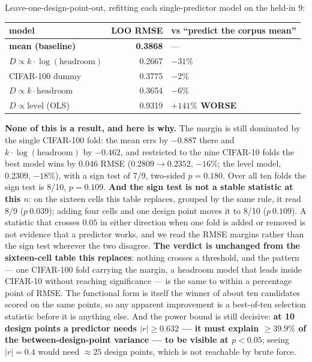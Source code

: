 \documentclass[10pt,letterpaper]{article}
\newcommand{\Dstat}{D}                         %
\begin{document}
Leave-one-design-point-out, refitting each single-predictor model on the held-in 9:

\begin{center}
\small
\begin{tabular}{@{}lrl@{}}
\toprule
model & LOO RMSE & vs ``predict the corpus mean'' \\
\midrule
\textbf{mean (baseline)} & \textbf{0.3868} & --- \\
$\Dstat \propto k\cdot\log(\text{headroom})$ & 0.2667 & $-31\%$ \\
CIFAR-100 dummy & 0.3775 & $-2\%$ \\
$\Dstat \propto k\cdot\text{headroom}$ & 0.3654 & $-6\%$ \\
$\Dstat \propto \text{level}$ (OLS) & 0.9319 & \textbf{$+141\%$ WORSE} \\
\bottomrule
\end{tabular}
\end{center}

\textbf{None of this is a result, and here is why.} The margin is still dominated by the single
CIFAR-100 fold: the mean errs by $-0.887$ there and $k\cdot\log(\text{headroom})$ by $-0.462$, and
restricted to the nine CIFAR-10 folds the best model wins by 0.046 RMSE
($0.2809 \rightarrow 0.2352$, $-16\%$; the level model, 0.2309, $-18\%$), with a sign test of
7/9, two-sided $p = 0.180$. Over all ten folds the sign test is 8/10, $p = 0.109$. \textbf{And the
sign test is not a stable statistic at this $n$}: on the sixteen cells this table replaces,
grouped by the same rule, it read 8/9 ($p\ 0.039$); adding four cells and one design point moves
it to 8/10 ($p\ 0.109$). A statistic that crosses $0.05$ in either direction when one fold is
added or removed is not evidence that a predictor works, and we read the RMSE margins rather than
the sign test wherever the two disagree. \textbf{The
verdict is unchanged from the sixteen-cell table this replaces}: nothing crosses a threshold, and
the pattern --- one CIFAR-100 fold carrying the margin, a headroom model that leads inside
CIFAR-10 without reaching significance --- is the same to within a percentage point of RMSE. The
functional form is itself the winner of about ten candidates scored on the same points, so any
apparent improvement is a best-of-ten selection statistic before it is anything else. And the
power bound is still decisive: \textbf{at 10 design points a predictor needs $|r| \ge 0.632$ ---
it must explain $\ge 39.9\%$ of the between-design-point variance --- to be visible at
$p < 0.05$}; seeing $|r| = 0.4$ would need $\approx 25$ design points, which is not reachable by
brute force.
\end{document}

